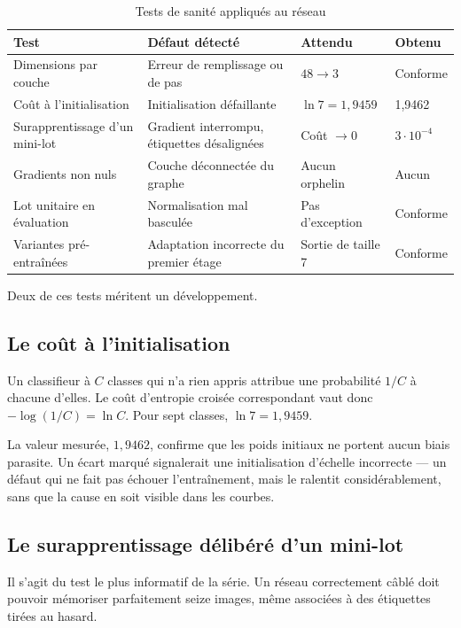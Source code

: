\documentclass[a4paper,12pt]{report}
\begin{document}
\begin{table}[htbp]
\centering
\caption{Tests de sanité appliqués au réseau}
\begin{tabular}{|p{3.6cm}|p{4.6cm}|l|l|}
\hline
\textbf{Test} & \textbf{Défaut détecté} & \textbf{Attendu} & \textbf{Obtenu} \\
\hline
Dimensions par couche & Erreur de remplissage ou de pas & $48 \to 3$ & \textcolor{accent}{Conforme} \\
Coût à l'initialisation & Initialisation défaillante & $\ln 7 = 1{,}9459$ & \textcolor{accent}{1{,}9462} \\
Surapprentissage d'un mini-lot & Gradient interrompu, étiquettes désalignées & Coût $\to 0$ & \textcolor{accent}{$3\cdot10^{-4}$} \\
Gradients non nuls & Couche déconnectée du graphe & Aucun orphelin & \textcolor{accent}{Aucun} \\
Lot unitaire en évaluation & Normalisation mal basculée & Pas d'exception & \textcolor{accent}{Conforme} \\
Variantes pré-entraînées & Adaptation incorrecte du premier étage & Sortie de taille 7 & \textcolor{accent}{Conforme} \\
\hline
\end{tabular}
\end{table}

Deux de ces tests méritent un développement.

\subsection{Le coût à l'initialisation}

Un classifieur à $C$ classes qui n'a rien appris attribue une probabilité $1/C$
à chacune d'elles. Le coût d'entropie croisée correspondant vaut donc
$-\log(1/C) = \ln C$. Pour sept classes, $\ln 7 = 1{,}9459$.

La valeur mesurée, $1{,}9462$, confirme que les poids initiaux ne portent aucun
biais parasite. Un écart marqué signalerait une initialisation d'échelle
incorrecte --- un défaut qui ne fait pas échouer l'entraînement, mais le ralentit
considérablement, sans que la cause en soit visible dans les courbes.

\subsection{Le surapprentissage délibéré d'un mini-lot}

Il s'agit du test le plus informatif de la série. Un réseau correctement câblé
doit pouvoir mémoriser parfaitement seize images, même associées à des
étiquettes tirées au hasard.
\end{document}
